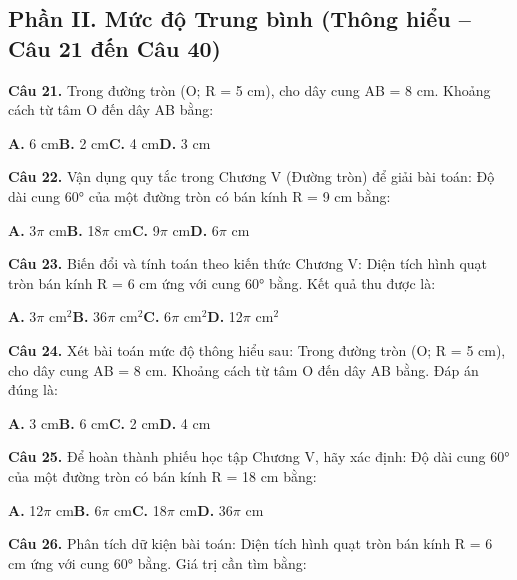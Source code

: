 \documentclass[11pt,a4paper]{article}
\begin{document}
\subsection*{\color{accent} Phần II. Mức độ Trung bình (Thông hiểu -- Câu 21 đến Câu 40)}
\textbf{\color{primary} Câu 21.} Trong đường tròn (O; R = 5 cm), cho dây cung AB = 8 cm. Khoảng cách từ tâm O đến dây AB bằng:\par
\hspace*{1.5em}\textbf{A.} 6 cm\quad\quad \textbf{B.} 2 cm\quad\quad \textbf{C.} 4 cm\quad\quad \textbf{D.} 3 cm\par\vspace{2pt}
\textbf{\color{primary} Câu 22.} Vận dụng quy tắc trong Chương V (Đường tròn) để giải bài toán: Độ dài cung 60° của một đường tròn có bán kính R = 9 cm bằng:\par
\hspace*{1.5em}\textbf{A.} 3$\pi$ cm\quad\quad \textbf{B.} 18$\pi$ cm\quad\quad \textbf{C.} 9$\pi$ cm\quad\quad \textbf{D.} 6$\pi$ cm\par\vspace{2pt}
\textbf{\color{primary} Câu 23.} Biến đổi và tính toán theo kiến thức Chương V: Diện tích hình quạt tròn bán kính R = 6 cm ứng với cung 60° bằng. Kết quả thu được là:\par
\hspace*{1.5em}\textbf{A.} 3$\pi$ cm$^2$\quad\quad \textbf{B.} 36$\pi$ cm$^2$\quad\quad \textbf{C.} 6$\pi$ cm$^2$\quad\quad \textbf{D.} 12$\pi$ cm$^2$\par\vspace{2pt}
\textbf{\color{primary} Câu 24.} Xét bài toán mức độ thông hiểu sau: Trong đường tròn (O; R = 5 cm), cho dây cung AB = 8 cm. Khoảng cách từ tâm O đến dây AB bằng. Đáp án đúng là:\par
\hspace*{1.5em}\textbf{A.} 3 cm\quad\quad \textbf{B.} 6 cm\quad\quad \textbf{C.} 2 cm\quad\quad \textbf{D.} 4 cm\par\vspace{2pt}
\textbf{\color{primary} Câu 25.} Để hoàn thành phiếu học tập Chương V, hãy xác định: Độ dài cung 60° của một đường tròn có bán kính R = 18 cm bằng:\par
\hspace*{1.5em}\textbf{A.} 12$\pi$ cm\quad\quad \textbf{B.} 6$\pi$ cm\quad\quad \textbf{C.} 18$\pi$ cm\quad\quad \textbf{D.} 36$\pi$ cm\par\vspace{2pt}
\textbf{\color{primary} Câu 26.} Phân tích dữ kiện bài toán: Diện tích hình quạt tròn bán kính R = 6 cm ứng với cung 60° bằng. Giá trị cần tìm bằng:\par
\end{document}
